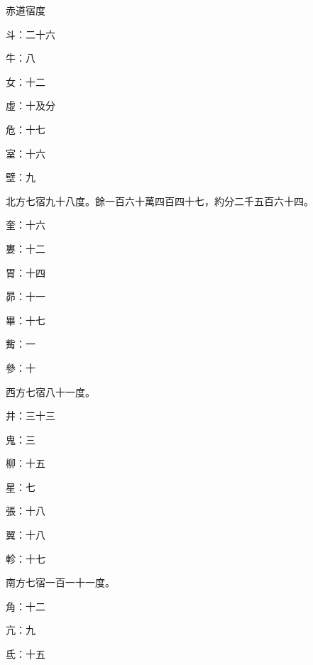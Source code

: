 \begin{pinyinscope}
 赤道宿度



 斗：二十六



 牛：八



 女：十二



 虛：十及分



 危：十七



 室：十六



 壁：九



 北方七宿九十八度。餘一百六十萬四百四十七，約分二千五百六十四。



 奎：十六



 婁：十二



 胃：十四



 昴：十一



 畢：十七



 觜：一



 參：十



 西方七宿八十一度。



 井：三十三



 鬼：三



 柳：十五



 星：七



 張：十八



 翼：十八



 軫：十七



 南方七宿一百一十一度。



 角：十二



 亢：九



 氐：十五




\end{pinyinscope}
